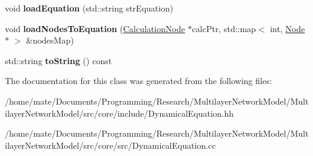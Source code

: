 \begin{DoxyCompactItemize}
\item 
void {\bfseries load\+Equation} (std\+::string str\+Equation)\hypertarget{classDynamicalEquation_aabe35a0aca2762081bd3b880f1648a87}{}\label{classDynamicalEquation_aabe35a0aca2762081bd3b880f1648a87}

\item 
void {\bfseries load\+Nodes\+To\+Equation} (\hyperlink{classCalculationNode}{Calculation\+Node} $\ast$calc\+Ptr, std\+::map$<$ int, \hyperlink{classNode}{Node} $\ast$ $>$ \&nodes\+Map)\hypertarget{classDynamicalEquation_a2c54698f5a05199a87ff0650836ff95c}{}\label{classDynamicalEquation_a2c54698f5a05199a87ff0650836ff95c}

\item 
std\+::string {\bfseries to\+String} () const \hypertarget{classDynamicalEquation_aed67e4c29392eb9c616b64acaa7500bc}{}\label{classDynamicalEquation_aed67e4c29392eb9c616b64acaa7500bc}

\end{DoxyCompactItemize}


The documentation for this class was generated from the following files\+:\begin{DoxyCompactItemize}
\item 
/home/mate/\+Documents/\+Programming/\+Research/\+Multilayer\+Network\+Model/\+Multilayer\+Network\+Model/src/core/include/Dynamical\+Equation.\+hh\item 
/home/mate/\+Documents/\+Programming/\+Research/\+Multilayer\+Network\+Model/\+Multilayer\+Network\+Model/src/core/src/Dynamical\+Equation.\+cc\end{DoxyCompactItemize}
